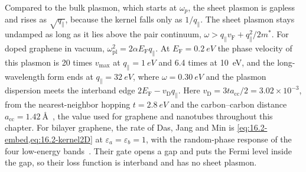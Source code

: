 Compared to the bulk plasmon, which starts at $\omega_p$, the sheet plasmon is gapless and rises as $\sqrt{q_\parallel}$, because the kernel falls only as $1/q_\parallel$. The sheet plasmon stays undamped as long as it lies above the pair continuum, $\omega > q_\parallel v_{\mathrm{F}} + q_\parallel^2/2m^*$. For doped graphene in vacuum, $\omega_{\mathrm{pl}}^2 = 2\alpha E_{\mathrm{F}}q_\parallel$. At $E_{\mathrm{F}} = \SI{0.2}{eV}$ the phase velocity of this plasmon is 20 times $v_{\mathrm{max}}$ at $q_\parallel = \SI{1}{eV}$ and 6.4 times at \SI{10}{eV}, and the long-wavelength form ends at $q_\parallel = \SI{32}{eV}$, where $\omega = \SI{0.30}{eV}$ and the plasmon dispersion meets the interband edge $2E_{\mathrm{F}} - v_{\mathrm{D}}q_\parallel$. Here $v_{\mathrm{D}} = 3ta_{\mathrm{cc}}/2 = 3.02\times10^{-3}$, from the nearest-neighbor hopping $t = \SI{2.8}{eV}$ and the carbon--carbon distance $a_{\mathrm{cc}} = \SI{1.42}{\angstrom}$~\cite[text after Eqs.~(5) and (7)]{castroneto2009electronic}, the value used for graphene and nanotubes throughout this chapter. For bilayer graphene, the rate of Das, Jang and Min is \cref{eq:16.2-embed,eq:16.2-kernel2D} at $\varepsilon_a = \varepsilon_b = 1$, with the random-phase response of the four low-energy bands~\cite[Eqs.~(13)--(19)]{das2023sub}. Their gate opens a gap and puts the Fermi level inside the gap, so their loss function is interband and has no sheet plasmon.

